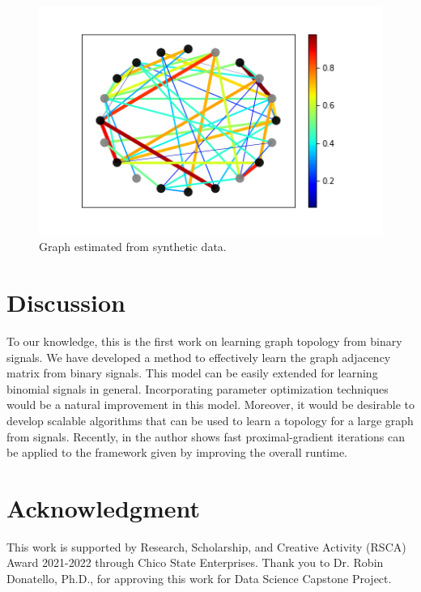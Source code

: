\documentclass[journal]{IEEEtran}
\theoremstyle{definition}
\theoremstyle{remark}
\begin{document}
\begin{figure}
  \includegraphics[width=\linewidth]{pictures/gt_graph.png}
  \caption{Graph estimated from synthetic data.}
  \label{fig:gt}
\end{figure}

\section{Discussion}

To our knowledge, this is the first work on learning graph topology from binary signals. We have developed a method to effectively learn the graph adjacency matrix from binary signals. This model can be easily extended for learning binomial signals in general. Incorporating parameter optimization techniques would be a natural improvement in this model. Moreover, it would be desirable to develop scalable algorithms that can be used to learn a topology for a large graph from signals. Recently, in \cite{saboksayr2021accelerated} the author shows fast proximal-gradient iterations can be applied to the framework given by \cite{kalofolias2016learn} improving the overall runtime.

\section*{Acknowledgment}

This work is supported by Research, Scholarship, and Creative Activity (RSCA) Award 2021-2022 through Chico State Enterprises. Thank you to Dr. Robin Donatello, Ph.D., for approving this work for Data Science Capstone Project.

\newpage



\end{document}

